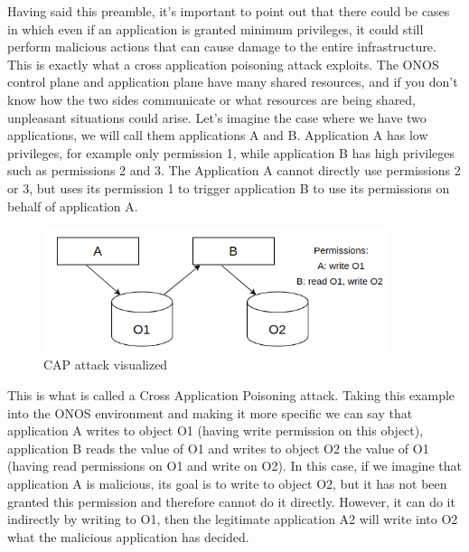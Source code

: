 Having said this preamble, it's important to point out that there could be cases in which even if an application is granted minimum privileges, it could still perform malicious actions that can cause damage to the entire infrastructure. This is exactly what a cross application poisoning attack exploits. The ONOS control plane and application plane have many shared resources, and if you don't know how the two sides communicate or what resources are being shared, unpleasant situations could arise. Let's imagine the case where we have two applications, we will call them applications A and B. Application A has low privileges, for example only permission 1, while application B has high privileges such as permissions 2 and 3. The Application A cannot directly use permissions 2 or 3, but uses its permission 1 to trigger application B to use its permissions on behalf of application A.
\begin{figure}[t]
\caption{CAP attack visualized}
\label{fig:cap1}
\includegraphics[width=0.90\textwidth]{resources/Chapter-1/cap1.png}
\centering
\end{figure}
This is what is called a Cross Application Poisoning attack. Taking this example into the ONOS environment and making it more specific we can say that application A writes to object O1 (having write permission on this object), application B reads the value of O1 and writes to object O2 the value of O1 (having read permissions on O1 and write on O2). In this case, if we imagine that application A is malicious, its goal is to write to object O2, but it has not been granted this permission and therefore cannot do it directly. However, it can do it indirectly by writing to O1, then the legitimate application A2 will write into O2 what the malicious application has decided.

